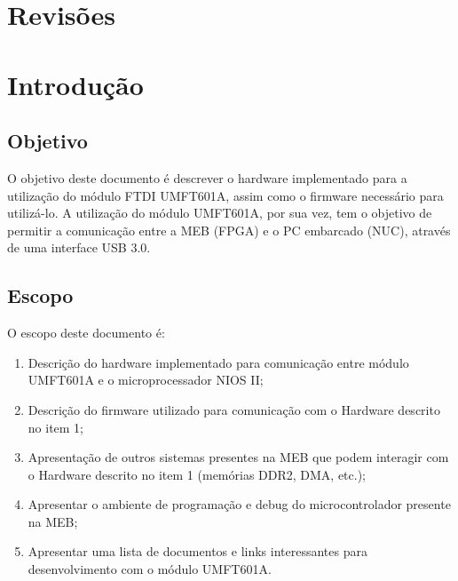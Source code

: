 \renewcommand{\contentsname}{Whatever}



\maketitle
\tableofcontents


\chapter*{Revisões}
\addrevisiontable

\chapter{Introdução}

  \section{Objetivo}
    O objetivo deste documento é descrever o hardware implementado para a utilização do módulo FTDI UMFT601A, assim como o firmware necessário para utilizá-lo. A utilização do módulo UMFT601A, por sua vez, tem o objetivo de permitir a comunicação entre a MEB (FPGA) e o PC embarcado (NUC), através de uma interface USB 3.0.

  \section{Escopo}
    O escopo deste documento é:
    \begin{enumerate}
    	\item Descrição do hardware implementado para comunicação entre módulo UMFT601A e o microprocessador NIOS II;
    	\item Descrição do firmware utilizado para comunicação com o Hardware descrito no item 1;
    	\item Apresentação de outros sistemas presentes na MEB que podem interagir com o Hardware descrito no item 1 (memórias DDR2, DMA, etc.);
    	\item Apresentar o ambiente de programação e debug do microcontrolador presente na MEB;
    	\item Apresentar uma lista de documentos e links interessantes para desenvolvimento com o módulo UMFT601A.
    \end{enumerate}
  
